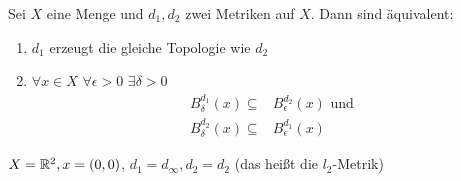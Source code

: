 
\begin{Proposition}{%
	Sei $X$ eine Menge und $d_1,d_2$ zwei Metriken auf $X$. Dann sind äquivalent:
	\begin{enumerate}
		\item \label{vl_22_stp_1} $d_1$ erzeugt die gleiche Topologie wie $d_2$
		\item \label{vl_22_stp_2} $\forall x \in X $ $ \forall \epsilon > 0 $ $\exists \delta > 0 $
		\begin{align*}
			B_\delta^{d_1}(x) \subseteq & B_\epsilon^{d_2}(x) \text{ und} \\
			B_\delta^{d_2}(x) \subseteq & B_\epsilon^{d_1}(x)
		\end{align*}
	\end{enumerate}
}\end{Proposition}

\begin{Beispiel}{
	$X = \mathbb{R}^2, x = (0,0)$,
	$d_1 = d_\infty, d_2 = d_2$ (das heißt die $l_2$-Metrik) 
}\end{Beispiel}

